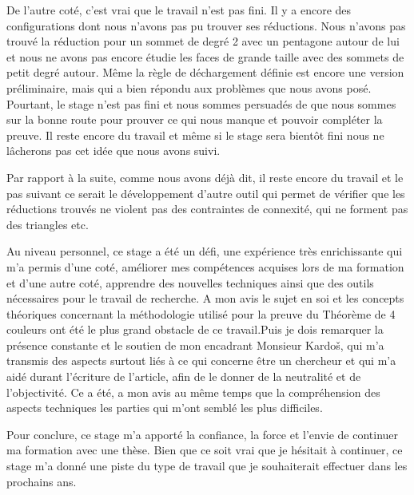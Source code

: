 \documentclass[10pt,a4paper]{article}
\begin{document}
De l'autre coté, c'est vrai que le travail n'est pas fini. Il y a encore des configurations dont nous n'avons pas pu trouver ses réductions. Nous n'avons pas trouvé la réduction pour un sommet de degré 2 avec un pentagone autour de lui et nous ne avons pas encore étudie les faces de grande taille avec des sommets de petit degré autour. Même la règle de déchargement définie est encore une version préliminaire, mais qui a bien répondu aux problèmes que nous avons posé. Pourtant, le stage n'est pas fini et nous sommes persuadés de que nous sommes sur la bonne route pour prouver ce qui nous manque et pouvoir compléter la preuve. Il reste encore du travail et même si le stage sera bientôt fini nous ne lâcherons pas cet idée que nous avons suivi.

Par rapport à la suite, comme nous avons déjà dit, il reste encore du travail et le pas suivant ce serait le développement d'autre outil qui permet de vérifier que les réductions trouvés ne violent pas des contraintes de connexité, qui ne forment pas des triangles etc.   
 

Au niveau personnel, ce stage a été un défi, une expérience très enrichissante qui m'a permis d'une coté, améliorer mes compétences acquises lors de ma formation et d'une autre coté, apprendre des nouvelles techniques ainsi que des outils nécessaires pour le travail de recherche. A mon avis le sujet en soi et les concepts théoriques concernant la méthodologie utilisé pour la preuve du Théorème de 4 couleurs ont été le plus grand obstacle de ce travail.Puis je dois remarquer la présence constante et le soutien de mon encadrant Monsieur Kardo\v s, qui m'a transmis des aspects surtout liés à ce qui concerne être un chercheur et qui m'a aidé durant l'écriture de l'article, afin de le donner de la neutralité et de l'objectivité. Ce a été, a mon avis au même temps que la compréhension des aspects techniques les parties qui m'ont semblé les plus difficiles.

Pour conclure, ce stage m'a apporté la confiance, la force et l'envie de continuer ma formation avec une thèse. Bien que ce soit vrai que je hésitait à continuer, ce stage m'a donné une piste du type de travail que je souhaiterait effectuer dans les prochains ans.
\end{document}
